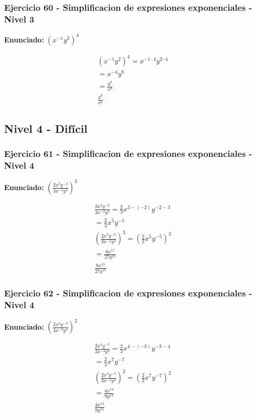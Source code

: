 \documentclass[12pt,a4paper]{article}
\begin{document}
\subsubsection*{Ejercicio 60 - Simplificacion de expresiones exponenciales - Nivel 3}
\textbf{Enunciado:} \(\left(x^{-1}y^{2}\right)^{4}\)

\[
\begin{aligned}
\left(x^{-1}y^{2}\right)^{4}=x^{-1\cdot 4}y^{2\cdot 4}\\
=x^{-4}y^{8}\\
=\frac{y^{8}}{x^{4}}\\
\boxed{\frac{y^{8}}{x^{4}}}
\end{aligned}
\]


\newpage

\subsection*{Nivel 4 - Difícil}

\subsubsection*{Ejercicio 61 - Simplificacion de expresiones exponenciales - Nivel 4}
\textbf{Enunciado:} \(\left(\frac{2x^{3}y^{-2}}{3x^{-2}y^{3}}\right)^{3}\)

\[
\begin{aligned}
\frac{2x^{3}y^{-2}}{3x^{-2}y^{3}}=\frac{2}{3}x^{3-(-2)}y^{-2-3}\\
=\frac{2}{3}x^{5}y^{-5}\\
\left(\frac{2x^{3}y^{-2}}{3x^{-2}y^{3}}\right)^{3}=\left(\frac{2}{3}x^{5}y^{-5}\right)^{3}\\
=\frac{8x^{15}}{27y^{15}}\\
\boxed{\frac{8x^{15}}{27y^{15}}}
\end{aligned}
\]


\subsubsection*{Ejercicio 62 - Simplificacion de expresiones exponenciales - Nivel 4}
\textbf{Enunciado:} \(\left(\frac{2x^{4}y^{-3}}{3x^{-3}y^{4}}\right)^{2}\)

\[
\begin{aligned}
\frac{2x^{4}y^{-3}}{3x^{-3}y^{4}}=\frac{2}{3}x^{4-(-3)}y^{-3-4}\\
=\frac{2}{3}x^{7}y^{-7}\\
\left(\frac{2x^{4}y^{-3}}{3x^{-3}y^{4}}\right)^{2}=\left(\frac{2}{3}x^{7}y^{-7}\right)^{2}\\
=\frac{4x^{14}}{9y^{14}}\\
\boxed{\frac{4x^{14}}{9y^{14}}}
\end{aligned}
\]
\end{document}
